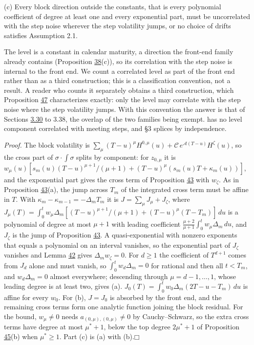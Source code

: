 \documentclass[11pt]{article}
\providecommand{\square}{\mdlgwhtsquare}
\begin{document}
(c) Every block direction outside the constants, that is every polynomial coefficient of degree at least one and every exponential part, must be uncorrelated with the step noise wherever the step volatility jumps, or no choice of drifts satisfies Assumption 2.1.

The level is a constant in calendar maturity, a direction the front-end family already contains (Proposition \hyperref[res:Proposition-38]{38}(c)), so its correlation with the step noise is internal to the front end. We count a correlated level as part of the front end rather than as a third construction; this is a classification convention, not a result. A reader who counts it separately obtains a third construction, which Proposition \hyperref[res:Proposition-47]{47} characterizes exactly: only the level may correlate with the step noise where the step volatility jumps. With this convention the answer is that of Sections \hyperref[sec:3.30]{3.30} to 3.38, the overlap of the two families being exempt. \cite{brace2024sofr} has no level component correlated with meeting steps, and \cite{gellert2021short} §3 splices by independence.

\emph{Proof.} The block volatility is \(\sum_\mu(T-u)^\mu H^{0,\mu}(u)+\mathcal C\,e^{\mathcal A(T-u)}H^\zeta(u)\), so the cross part of \(\sigma\cdot\int\sigma\) splits by component: for \(z_{0,\mu}\) it is \(w_\mu(u)[s_m(u)(T-u)^{\mu+1}/(\mu+1)+(T-u)^\mu(s_m(u)T+\kappa_m(u))]\), and the exponential part gives the cross term of Proposition \hyperref[res:Proposition-43]{43} with \(w_\zeta\). As in Proposition \hyperref[res:Proposition-43]{43}(a), the jump across \(T_m\) of the integrated cross term must be affine in \(T\). With \(\kappa_m-\kappa_{m-1}=-\Delta_mT_m\) it is \(J=\sum_\mu J_\mu+J_\zeta\), where \(J_\mu(T)=\int_0^tw_\mu\Delta_m[(T-u)^{\mu+1}/(\mu+1)+(T-u)^\mu(T-T_m)]\,du\) is a polynomial of degree at most \(\mu+1\) with leading coefficient \(\frac{\mu+2}{\mu+1}\int_0^tw_\mu\Delta_m\,du\), and \(J_\zeta\) is the jump of Proposition \hyperref[res:Proposition-43]{43}. A quasi-exponential with nonzero exponents that equals a polynomial on an interval vanishes, so the exponential part of \(J_\zeta\) vanishes and Lemma \hyperref[res:Lemma-42]{42} gives \(\Delta_mw_\zeta=0\). For \(d\ge1\) the coefficient of \(T^{d+1}\) comes from \(J_d\) alone and must vanish, so \(\int_0^tw_d\Delta_m=0\) for rational and then all \(t<T_m\), and \(w_d\Delta_m=0\) almost everywhere; descending through \(\mu=d-1,\dots,1\), whose leading degree is at least two, gives (a). \(J_0(T)=\int_0^tw_0\Delta_m(2T-u-T_m)\,du\) is affine for every \(w_0\). For (b), \(J=J_0\) is absorbed by the front end, and the remaining cross terms form one analytic function joining the block residual. For the bound, \(w_\mu\neq0\) needs \(a_{(0,\mu),(0,\mu)}\neq0\) by Cauchy--Schwarz, so the extra cross terms have degree at most \(\mu^*+1\), below the top degree \(2\mu^*+1\) of Proposition \hyperref[res:Proposition-45]{45}(b) when \(\mu^*\ge1\). Part (c) is (a) with (b).\hfill$\square$
\end{document}
